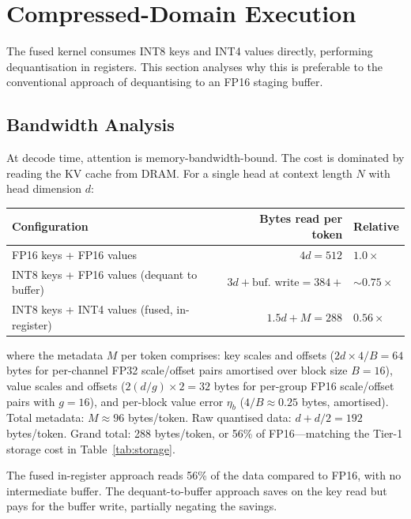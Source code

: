 \documentclass[11pt,a4paper]{article}
\theoremstyle{definition}
\theoremstyle{remark}
\begin{document}
\section{Compressed-Domain Execution}
\label{sec:compressed}

The fused kernel consumes INT8 keys and INT4 values directly, performing dequantisation in registers.  This section analyses why this is preferable to the conventional approach of dequantising to an FP16 staging buffer.

\subsection{Bandwidth Analysis}

At decode time, attention is memory-bandwidth-bound.  The cost is dominated by reading the KV cache from DRAM\@.  For a single head at context length $N$ with head dimension $d$:

\begin{center}
\small
\begin{tabular}{lrl}
\toprule
\textbf{Configuration} & \textbf{Bytes read per token} & \textbf{Relative} \\
\midrule
FP16 keys + FP16 values & $4d = 512$ & $1.0\times$ \\
INT8 keys + FP16 values (dequant to buffer) & $3d + \text{buf.\ write} = 384{+}$ & $\sim 0.75\times$ \\
INT8 keys + INT4 values (fused, in-register) & $1.5d + M = 288$ & $0.56\times$ \\
\bottomrule
\end{tabular}
\end{center}

\noindent where the metadata $M$ per token comprises: key scales and offsets ($2d \times 4/B = 64$ bytes for per-channel FP32 scale/offset pairs amortised over block size $B{=}16$), value scales and offsets ($2(d/g) \times 2 = 32$ bytes for per-group FP16 scale/offset pairs with $g{=}16$), and per-block value error $\eta_b$ ($4/B \approx 0.25$ bytes, amortised).  Total metadata: $M \approx 96$ bytes/token.  Raw quantised data: $d + d/2 = 192$ bytes/token.  Grand total: 288 bytes/token, or 56\% of FP16---matching the Tier-1 storage cost in Table~\ref{tab:storage}.

The fused in-register approach reads 56\% of the data compared to FP16, with no intermediate buffer.  The dequant-to-buffer approach saves on the key read but pays for the buffer write, partially negating the savings.
\end{document}
